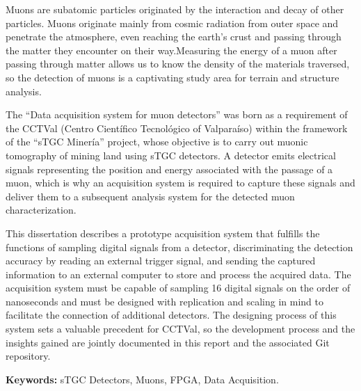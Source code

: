 Muons are subatomic particles originated by the interaction and decay of other particles. Muons originate mainly from cosmic radiation from outer space and penetrate the atmosphere, even reaching the earth's crust and passing through the matter they encounter on their way.Measuring the energy of a muon after passing through matter allows us to know the density of the materials traversed, so the detection of muons is a captivating study area for terrain and structure analysis.

The ``Data acquisition system for muon detectors'' was born as a requirement of the CCTVal (Centro Científico Tecnológico of Valparaíso) within the framework of the ``sTGC Minería'' project, whose objective is to carry out muonic tomography of mining land using sTGC detectors. A detector emits electrical signals representing the position and energy associated with the passage of a muon, which is why an acquisition system is required to capture these signals and deliver them to a subsequent analysis system for the detected muon characterization.

This dissertation describes a prototype acquisition system that fulfills the functions of sampling digital signals from a detector, discriminating the detection accuracy by reading an external trigger signal, and sending the captured information to an external computer to store and process the acquired data. The acquisition system must be capable of sampling 16 digital signals on the order of nanoseconds and must be designed with replication and scaling in mind to facilitate the connection of additional detectors. The designing process of this system sets a valuable precedent for CCTVal, so the development process and the insights gained are jointly documented in this report and the associated Git repository.

\textbf {Keywords:}  sTGC Detectors,  Muons, FPGA, Data Acquisition.